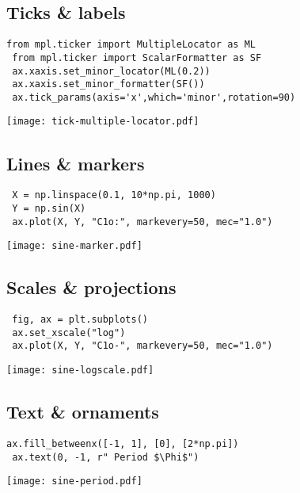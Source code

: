 \documentclass[10pt,landscape,a4paper]{article}
\begin{document}
\begin{multicols*}{3}
\subsection*{\rmfamily Ticks \& labels}

\begin{lstlisting}[basicstyle=\ttfamily\small]
 from mpl.ticker import MultipleLocator as ML
 from mpl.ticker import ScalarFormatter as SF
 ax.xaxis.set_minor_locator(ML(0.2))
 ax.xaxis.set_minor_formatter(SF())
 ax.tick_params(axis='x',which='minor',rotation=90)
\end{lstlisting}
\texttt{[image: tick-multiple-locator.pdf]}

\subsection*{\rmfamily Lines \& markers}

\begin{lstlisting}
 X = np.linspace(0.1, 10*np.pi, 1000)
 Y = np.sin(X)
 ax.plot(X, Y, "C1o:", markevery=50, mec="1.0")
\end{lstlisting}
\texttt{[image: sine-marker.pdf]}

\subsection*{\rmfamily Scales \& projections}

\begin{lstlisting}
 fig, ax = plt.subplots()
 ax.set_xscale("log")
 ax.plot(X, Y, "C1o-", markevery=50, mec="1.0")
\end{lstlisting}
\texttt{[image: sine-logscale.pdf]}

\subsection*{\rmfamily Text \& ornaments}
\begin{lstlisting}[]
 ax.fill_betweenx([-1, 1], [0], [2*np.pi])
 ax.text(0, -1, r" Period $\Phi$")
\end{lstlisting}
\texttt{[image: sine-period.pdf]}



\end{multicols*}
\end{document}
